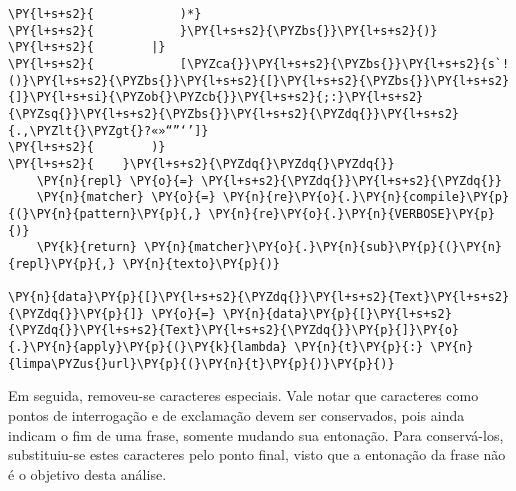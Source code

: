 \documentclass[a4paper,11pt,final]{article}
\begin{document}
\begin{Verbatim}[commandchars=\\\{\},frame=single,fontsize=\small, xleftmargin=0.5em]
\PY{l+s+s2}{            )*}
\PY{l+s+s2}{            }\PY{l+s+s2}{\PYZbs{}}\PY{l+s+s2}{)}
\PY{l+s+s2}{        |}
\PY{l+s+s2}{            [\PYZca{}}\PY{l+s+s2}{\PYZbs{}}\PY{l+s+s2}{s`!()}\PY{l+s+s2}{\PYZbs{}}\PY{l+s+s2}{[}\PY{l+s+s2}{\PYZbs{}}\PY{l+s+s2}{]}\PY{l+s+si}{\PYZob{}\PYZcb{}}\PY{l+s+s2}{;:}\PY{l+s+s2}{\PYZsq{}}\PY{l+s+s2}{\PYZbs{}}\PY{l+s+s2}{\PYZdq{}}\PY{l+s+s2}{.,\PYZlt{}\PYZgt{}?«»“”‘’]}
\PY{l+s+s2}{        )}
\PY{l+s+s2}{    }\PY{l+s+s2}{\PYZdq{}\PYZdq{}\PYZdq{}}
    \PY{n}{repl} \PY{o}{=} \PY{l+s+s2}{\PYZdq{}}\PY{l+s+s2}{\PYZdq{}}
    \PY{n}{matcher} \PY{o}{=} \PY{n}{re}\PY{o}{.}\PY{n}{compile}\PY{p}{(}\PY{n}{pattern}\PY{p}{,} \PY{n}{re}\PY{o}{.}\PY{n}{VERBOSE}\PY{p}{)}
    \PY{k}{return} \PY{n}{matcher}\PY{o}{.}\PY{n}{sub}\PY{p}{(}\PY{n}{repl}\PY{p}{,} \PY{n}{texto}\PY{p}{)}

\PY{n}{data}\PY{p}{[}\PY{l+s+s2}{\PYZdq{}}\PY{l+s+s2}{Text}\PY{l+s+s2}{\PYZdq{}}\PY{p}{]} \PY{o}{=} \PY{n}{data}\PY{p}{[}\PY{l+s+s2}{\PYZdq{}}\PY{l+s+s2}{Text}\PY{l+s+s2}{\PYZdq{}}\PY{p}{]}\PY{o}{.}\PY{n}{apply}\PY{p}{(}\PY{k}{lambda} \PY{n}{t}\PY{p}{:} \PY{n}{limpa\PYZus{}url}\PY{p}{(}\PY{n}{t}\PY{p}{)}\PY{p}{)}
\end{Verbatim}


Em seguida, removeu-se caracteres especiais. Vale notar que caracteres como pontos de interrogação e de exclamação devem ser conservados, pois ainda indicam o fim de uma frase, somente mudando sua entonação.
Para conservá-los, substituiu-se estes caracteres pelo ponto final, visto que a entonação da frase não é o objetivo desta análise.
\end{document}
